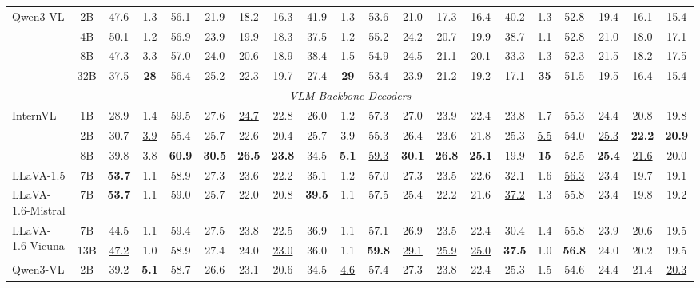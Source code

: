 \begin{table}[t]
{\begin{tabular}{lc|cccccc|cccccc|cccccc}
\multirow{4}{*}{Qwen3-VL} & 2B & 47.6 & 1.3 & 56.1 & 21.9 & 18.2 & 16.3 & 41.9 & 1.3 & 53.6 & 21.0 & 17.3 & 16.4 & 40.2 & 1.3 & 52.8 & 19.4 & 16.1 & 15.4 \\
 & 4B & 50.1 & 1.2 & 56.9 & 23.9 & 19.9 & 18.3 & 37.5 & 1.2 & 55.2 & 24.2 & 20.7 & 19.9 & 38.7 & 1.1 & 52.8 & 21.0 & 18.0 & 17.1 \\
 & 8B & 47.3 & \underline{3.3} & 57.0 & 24.0 & 20.6 & 18.9 & 38.4 & 1.5 & 54.9 & \underline{24.5} & 21.1 & \underline{20.1} & 33.3 & 1.3 & 52.3 & 21.5 & 18.2 & 17.5 \\
 & 32B & 37.5 & \textbf{28} & 56.4 & \underline{25.2} & \underline{22.3} & 19.7 & 27.4 & \textbf{29} & 53.4 & 23.9 & \underline{21.2} & 19.2 & 17.1 & \textbf{35} & 51.5 & 19.5 & 16.4 & 15.4 \\
\midrule
\multicolumn{20}{c}{\textit{VLM Backbone Decoders}} \\
\midrule
\multirow{3}{*}{InternVL} & 1B & 28.9 & 1.4 & 59.5 & 27.6 & \underline{24.7} & 22.8 & 26.0 & 1.2 & 57.3 & 27.0 & 23.9 & 22.4 & 23.8 & 1.7 & 55.3 & 24.4 & 20.8 & 19.8 \\
 & 2B & 30.7 & \underline{3.9} & 55.4 & 25.7 & 22.6 & 20.4 & 25.7 & 3.9 & 55.3 & 26.4 & 23.6 & 21.8 & 25.3 & \underline{5.5} & 54.0 & \underline{25.3} & \textbf{22.2} & \textbf{20.9} \\
 & 8B & 39.8 & 3.8 & \textbf{60.9} & \textbf{30.5} & \textbf{26.5} & \textbf{23.8} & 34.5 & \textbf{5.1} & \underline{59.3} & \textbf{30.1} & \textbf{26.8} & \textbf{25.1} & 19.9 & \textbf{15} & 52.5 & \textbf{25.4} & \underline{21.6} & 20.0 \\
LLaVA-1.5 & 7B & \textbf{53.7} & 1.1 & 58.9 & 27.3 & 23.6 & 22.2 & 35.1 & 1.2 & 57.0 & 27.3 & 23.5 & 22.6 & 32.1 & 1.6 & \underline{56.3} & 23.4 & 19.7 & 19.1 \\
LLaVA-1.6-Mistral & 7B & \textbf{53.7} & 1.1 & 59.0 & 25.7 & 22.0 & 20.8 & \textbf{39.5} & 1.1 & 57.5 & 25.4 & 22.2 & 21.6 & \underline{37.2} & 1.3 & 55.8 & 23.4 & 19.8 & 19.2 \\
\multirow{2}{*}{LLaVA-1.6-Vicuna} & 7B & 44.5 & 1.1 & 59.4 & 27.5 & 23.8 & 22.5 & 36.9 & 1.1 & 57.1 & 26.9 & 23.5 & 22.4 & 30.4 & 1.4 & 55.8 & 23.9 & 20.6 & 19.5 \\
 & 13B & \underline{47.2} & 1.0 & 58.9 & 27.4 & 24.0 & \underline{23.0} & 36.0 & 1.1 & \textbf{59.8} & \underline{29.1} & \underline{25.9} & \underline{25.0} & \textbf{37.5} & 1.0 & \textbf{56.8} & 24.0 & 20.2 & 19.5 \\
\multirow{4}{*}{Qwen3-VL} & 2B & 39.2 & \textbf{5.1} & 58.7 & 26.6 & 23.1 & 20.6 & 34.5 & \underline{4.6} & 57.4 & 27.3 & 23.8 & 22.4 & 25.3 & 1.5 & 54.6 & 24.4 & 21.4 & \underline{20.3} \\

\end{tabular}}
\end{table}
